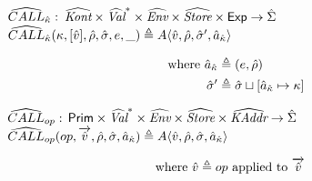 \documentclass[12pt,draft]{article}
\newcommand{\A}[4]{A\langle #1 , #2 , #3 , #4 \rangle}
\begin{document}
\begin{multicols*}{2}
\begin{align*}
  \end{align*}
  \begin{center}
    $\widehat{CALL}_{\hat{\kappa}} :$
    $ \widehat{\textit{Kont}} \times \widehat{\textit{Val}}^* \times \widehat{\textit{Env}} \times \widehat{\textit{Store}} \times \textsf{Exp}
    \rightarrow \hat{\Sigma}$
    $\aCALL_{\akont}(\kappa , [\aval] , \aenv , \astore , e , \_) \triangleq
    \A{\aval}{\aenv}{\astore'}{\akaddr}$
  \end{center}
  \vspace{-7mm}
  \begin{align*}
    \text{where }
    \hat{a}_{\hat{\kappa}} &\triangleq (e , \hat{\rho}) \\
    \hat{\sigma}' &\triangleq \hat{\sigma} \sqcup [\hat{a}_{\hat{\kappa}} \mapsto \kappa]
  \end{align*}
  \begin{center}
    $\widehat{CALL}_{op} :$
    $ \textsf{Prim} \times \widehat{\textit{Val}}^* \times \widehat{\textit{Env}} \times \widehat{\textit{Store}} \times \widehat{\textit{KAddr}}
    \rightarrow \hat{\Sigma}$
    $\aCALL_{op}(op, \overrightarrow{\aval} , \aenv , \astore , \akaddr) \triangleq
    \A{\aval}{\aenv}{\astore}{\akaddr}$
  \end{center}
  \vspace{-7mm}
  \begin{align*}
    \text{where }
    \hat{v} &\triangleq op \text{ applied to } \overrightarrow{\hat{v}}
  \end{align*}
\end{multicols*}


\newpage
\end{document}
